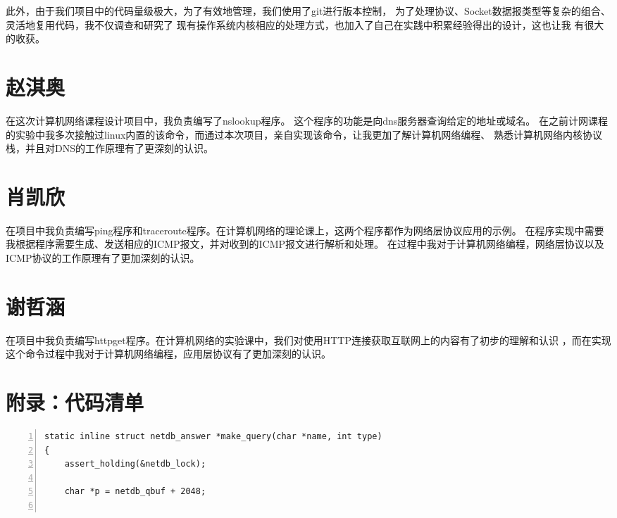 \documentclass[a4paper,twoside]{ctexrep}
\begin{document}
\begin{spacing}{1.2}
此外，由于我们项目中的代码量级极大，为了有效地管理，我们使用了git进行版本控制，
为了处理协议、Socket数据报类型等复杂的组合、灵活地复用代码，我不仅调查和研究了
现有操作系统内核相应的处理方式，也加入了自己在实践中积累经验得出的设计，这也让我
有很大的收获。

\section{赵淇奥}

在这次计算机网络课程设计项目中，我负责编写了nslookup程序。
这个程序的功能是向dns服务器查询给定的地址或域名。
在之前计网课程的实验中我多次接触过linux内置的该命令，而通过本次项目，亲自实现该命令，让我更加了解计算机网络编程、
熟悉计算机网络内核协议栈，并且对DNS的工作原理有了更深刻的认识。

\section{肖凯欣}

在项目中我负责编写ping程序和traceroute程序。在计算机网络的理论课上，这两个程序都作为网络层协议应用的示例。
在程序实现中需要我根据程序需要生成、发送相应的ICMP报文，并对收到的ICMP报文进行解析和处理。
在过程中我对于计算机网络编程，网络层协议以及ICMP协议的工作原理有了更加深刻的认识。

\section{谢哲涵}

在项目中我负责编写httpget程序。在计算机网络的实验课中，我们对使用HTTP连接获取互联网上的内容有了初步的理解和认识
，而在实现这个命令过程中我对于计算机网络编程，应用层协议有了更加深刻的认识。

\clearpage
{}




\clearpage
\section*{附录：代码清单}
\label{sec:appdixcode}

\begin{lstlisting}[numbers=left,style=CppStyle,caption={DNS报文构造},label={code:dnsquery}]
static inline struct netdb_answer *make_query(char *name, int type)
{
	assert_holding(&netdb_lock);

	char *p = netdb_qbuf + 2048;


\end{lstlisting}
\end{spacing}
\end{document}
